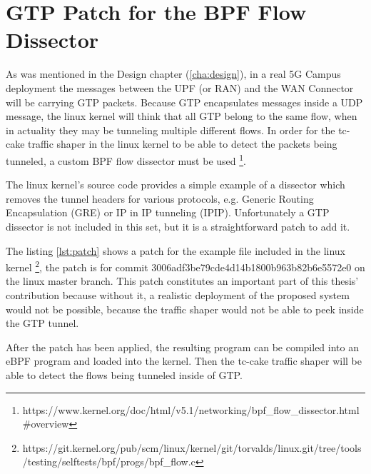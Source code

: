

\cleardoublepage
\chapter{GTP Patch for the BPF Flow Dissector}
\label{appendix:patch}

As was mentioned in the Design chapter (\ref{cha:design}), in a real 5G Campus deployment the messages between the UPF (or RAN) and the WAN Connector will be carrying GTP packets. Because GTP encapsulates messages inside a UDP message, the linux kernel will think that all GTP belong to the same flow, when in actuality they may be tunneling multiple different flows. In order for the tc-cake traffic shaper in the linux kernel to be able to detect the packets being tunneled, a custom BPF flow dissector must be used \footnote{https://www.kernel.org/doc/html/v5.1/networking/bpf\_flow\_dissector.html\#overview}.

The linux kernel's source code provides a simple example of a dissector which removes the tunnel headers for various protocols, e.g. Generic Routing Encapsulation (GRE) or IP in IP tunneling (IPIP). Unfortunately a GTP dissector is not included in this set, but it is a straightforward patch to add it.

The listing \ref{lst:patch} shows a patch for the example file included in the linux kernel \footnote{https://git.kernel.org/pub/scm/linux/kernel/git/torvalds/linux.git/tree/tools/testing/selftests/bpf/progs/bpf\_flow.c}, the patch is for commit 3006adf3be79cde4d14b1800b963b82b6e5572e0 on the linux master branch. This patch constitutes an important part of this thesis' contribution because without it, a realistic deployment of the proposed system would not be possible, because the traffic shaper would not be able to peek inside the GTP tunnel.

After the patch has been applied, the resulting program can be compiled into an eBPF program and loaded into the kernel. Then the tc-cake traffic shaper will be able to detect the flows being tunneled inside of GTP.

\clearpage


